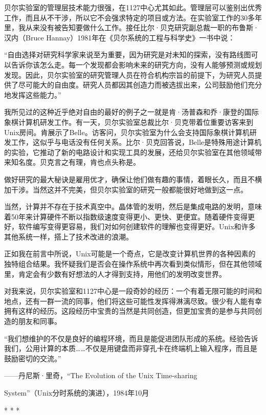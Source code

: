\documentclass[a4paper,12pt,UTF8,twoside]{ctexbook}
\begin{document}
贝尔实验室的管理层技术能力很强，在1127中心尤其如此。管理层可以鉴别出优秀工作，而且从不干涉，所以它不会强求特定的项目或方法。在实验室工作的30多年里，我从来没有被告知要做什么工作。接任比尔·贝克研究副总裁一职的布鲁斯·汉内（Bruce Hannay）1981年在《贝尔系统的工程与科学史》一书中说：

“自由选择对研究科学家来说至为重要，因为研究是对未知的探索，没有路线图可以告诉你该怎么走。每一个发现都会影响未来的研究方向，没有人能够预测或规划发现。因此，贝尔实验室的研究管理人员在符合机构宗旨的前提下，为研究人员提供了尽可能大的自由度。研究人员都因其创造力而被选拔出来，公司鼓励他们充分地发挥这些能力。”



我所见过的这种近乎绝对自由的最好的例子之一就是肯·汤普森和乔·康登的国际象棋计算机研发工作。有一天，贝尔实验室总裁比尔·贝克带着位重要访客来到Unix房间。肯展示了Belle。访客问，贝尔实验室为什么会支持国际象棋计算机研发工作，这似乎与电话没有任何关系。比尔·贝克回答说，Belle是特殊用途计算机的实验，它推动了新的电路设计和实现工具的发展，还给贝尔实验室在其他领域带来知名度。贝克言之有理，肯也点头称是。

做好研究的最大秘诀是雇用优才，确保让他们做有趣的事情，着眼长久，而且不横加干涉。当然这并不完美，但贝尔实验室的研究一般都能很好地做到这一点。

当然，计算并不存在于技术真空中。晶体管的发明，然后是集成电路的发明，意味着50年来计算硬件不断以指数级速度变得更小、更快、更便宜。随着硬件变得更好，软件编写变得更容易，我们对如何创建软件的理解也变得更好。Unix和许多其他系统一样，搭上了技术改进的浪潮。

正如我在前言中所说，Unix可能是一个奇点，它是改变计算机世界的各种因素的独特组合结果。我怀疑我们是否会在操作系统中再次看到类似情形，但在其他领域里，肯定会有少数有好想法的人才得到支持，用他们的发明改变世界。

对我来说，贝尔实验室和1127中心是一段奇妙的经历：一个有着无限可能的时间和地点，还有一群一流的同事，他们将这些可能性发挥得淋漓尽致。很少有人能有幸拥有这样的经历。这段经历中宝贵的当然是共同创造，但更加宝贵的是参与共同创造的朋友和同事。

“我们想维护的不仅是良好的编程环境，而且是能促进团队形成的系统。经验告诉我们，公用计算的本质……不仅是用键盘而非穿孔卡在终端机上输入程序，而且是鼓励密切的交流。”

——丹尼斯·里奇，“The Evolution of the Unix Time-sharing

System”（Unix分时系统的演进），1984年10月





* * *
\end{document}
